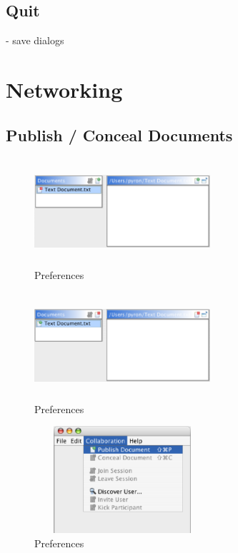 \documentclass[11pt,a4paper]{article}
\begin{document}
\subsection{Quit}
- save dialogs




\newpage
\section{Networking}

\subsection{Publish / Conceal Documents}
\begin{figure}[H]
\begin{center}
  \includegraphics[height=1.56in, width=2.56in]{../images/usermanual/editor_view_publish.bmp.eps}
\caption{Preferences}
\label{default}
\end{center}
\end{figure}
\begin{figure}[H]
\begin{center}
  \includegraphics[height=1.56in, width=2.56in]{../images/usermanual/editor_view_conceal.bmp.eps}
\caption{Preferences}
\label{default}
\end{center}
\end{figure}
\begin{figure}[H]
\begin{center}
  \includegraphics[height=1.56in, width=2.56in]{../images/usermanual/nmenu_collaboration_publish.bmp.eps}
\caption{Preferences}
\label{default}
\end{center}
\end{figure}
\end{document}
